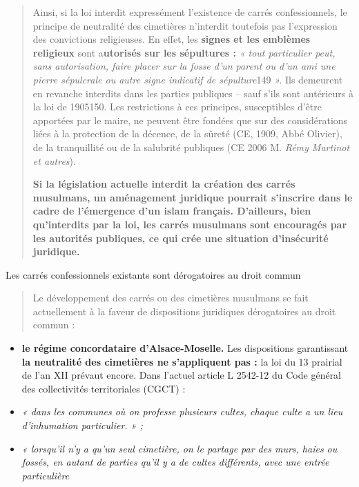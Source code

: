 \begin{quote}
Ainsi, si la loi interdit expressément l'existence de carrés
confessionnels, le principe de neutralité des cimetières n'interdit
toutefois pas l'expression des convictions religieuses. En effet, les
\textbf{signes et les emblèmes religieux} sont a\textbf{utorisés sur les
sépultures :} \emph{« tout particulier peut, sans autorisation, faire
placer sur la fosse d'un parent ou d'un ami une pierre sépulcrale ou
autre signe indicatif de sépulture}149 \emph{».} Ils demeurent en
revanche interdits dans les parties publiques -- sauf s'ils sont
antérieurs à la loi de 1905150. Les restrictions à ces principes,
susceptibles d'être apportées par le maire, ne peuvent être fondées que
sur des considérations liées à la protection de la décence, de la sûreté
(CE, 1909, Abbé Olivier), de la tranquillité ou de la salubrité
publiques (CE 2006 M. \emph{Rémy Martinot et autres}).

\textbf{Si la législation actuelle interdit la création des carrés
musulmans, un aménagement juridique pourrait s'inscrire dans le cadre de
l'émergence d'un islam français. D'ailleurs, bien qu'interdits par la
loi, les carrés musulmans sont encouragés par les autorités publiques,
ce qui crée une situation d'insécurité juridique.}
\end{quote}

Les carrés confessionnels existants sont dérogatoires au droit commun

\begin{quote}
Le développement des carrés ou des cimetières musulmans se fait
actuellement à la faveur de dispositions juridiques dérogatoires au
droit commun :
\end{quote}

\begin{itemize}
\item
  \textbf{le régime concordataire d'Alsace-Moselle.} Les dispositions
  garantissant \textbf{la neutralité des cimetières ne s'appliquent pas
  :} la loi du 13 prairial de l'an XII prévaut encore. Dans l'actuel
  article L 2542-12 du Code général des collectivités territoriales
  (CGCT) :
\end{itemize}

\begin{itemize}
\item
  \emph{« dans les communes où on professe plusieurs cultes, chaque
  culte a un lieu d'inhumation particulier. » ;}
\item
  \emph{« lorsqu'il n'y a qu'un seul cimetière, on le partage par des
  murs, haies ou fossés, en autant de parties qu'il y a de cultes
  différents, avec une entrée particulière}
\end{itemize}

